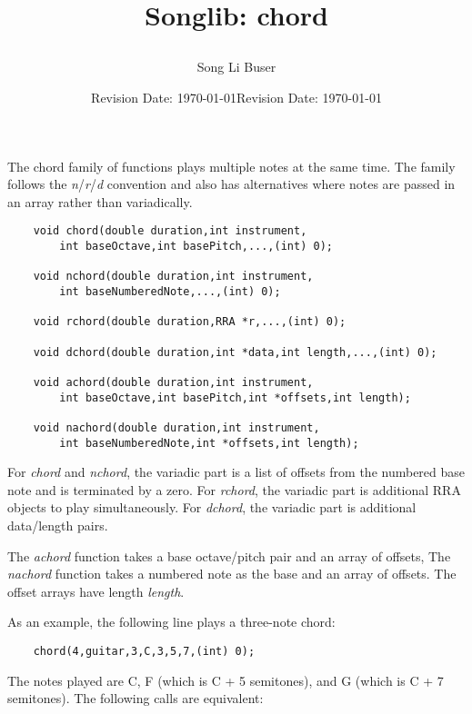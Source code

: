 \documentclass{article}
\title{Songlib: chord\\
\date{Revision Date: \today}}
\author{Song Li Buser}
\date{Revision Date: \today}
\begin{document}
\maketitle

\W\subsubsection*{}
\W\htmlrule

The chord family of functions plays multiple notes at the same time.
The family follows the {\it n}/{\it r}/{\it d} convention and also has alternatives
where notes are passed in an array rather than variadically.

\begin{verbatim}
    void chord(double duration,int instrument,
        int baseOctave,int basePitch,...,(int) 0);

    void nchord(double duration,int instrument,
        int baseNumberedNote,...,(int) 0);

    void rchord(double duration,RRA *r,...,(int) 0);

    void dchord(double duration,int *data,int length,...,(int) 0);

    void achord(double duration,int instrument,
        int baseOctave,int basePitch,int *offsets,int length);
    
    void nachord(double duration,int instrument,
        int baseNumberedNote,int *offsets,int length);
\end{verbatim}

For {\it chord} and {\it nchord}, the variadic part is a list of
offsets from the numbered base note and is terminated by a zero. For {\it rchord},
the variadic part is additional RRA objects to play simultaneously.
For {\it dchord}, the variadic part is additional data/length pairs.

The {\it achord} function takes a base octave/pitch pair and an array of offsets,
The {\it nachord} function takes a numbered note as the base and an array 
of offsets. The offset arrays have length {\it length}.

As an example, the following line plays a three-note chord:

\begin{verbatim}
    chord(4,guitar,3,C,3,5,7,(int) 0);
\end{verbatim}

The notes played are C, F (which is C + 5 semitones), and G (which is C + 7
semitones). The following calls are equivalent:
\end{document}
